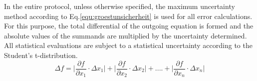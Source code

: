 In the entire protocol, unless otherwise specified, the maximum uncertainty method according to Eq.\ref{equ:groestunsicherheit} \cite{MMETH} is used for all error calculations.
For this purpose, the total differential of the outgoing equation is formed and the absolute values of the summands are multiplied by the uncertainty determined.
All statistical evaluations are subject to a statistical uncertainty according to the Student's t-distribution.
\begin{equation}
    \varDelta f = \biggl| \frac{\partial f}{\partial x_{1}} \cdot \varDelta x_{1} \biggl| + \biggl| \frac{\partial f}{\partial x_{2}} \cdot \varDelta x_{2} \biggl| + .... + \biggl| \frac{\partial f}{\partial x_{n}} \cdot \varDelta x_{n} \biggl|
    \label{equ:groestunsicherheit}
\end{equation}
\newpage